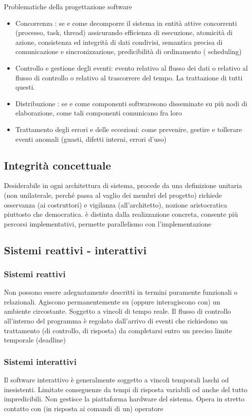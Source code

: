 Problematiche della progettazione software
\begin{itemize}
\item Concorrenza : se e come decomporre il sistema in entità attive concorrenti (processo, task, thread) assicurando efficienza di esecuzione, atomicità di azione, consistenza ed integrità di dati condivisi, semantica precisa di comunicazione e sincronizzazione, predicibilità di ordinamento ( scheduling)
\item Controllo e gestione degli eventi: evento relativo al flusso dei dati o relativo al flusso di controllo o relativo al trascorrere del tempo. La trattazione di tutti questi.
\item Distribuzione : se e come componenti softwaresono disseminate su più nodi di elaborazione, come tali componenti comunicano fra loro
\item Trattamento degli errori e delle eccezioni: come prevenire, gestire e tollerare eventi anomali (guasti, difetti interni, errori d'uso)
\end{itemize}

\subsection{Integrità concettuale}
Desiderabile in ogni architettura di sistema, procede da una definizione unitaria (non unilaterale, perché passa al vaglio dei membri del progetto) richiede osservanza (ai costruttori) e vigilanza (all'architetto), nozione aristocratica piuttosto che democratica. è distinta dalla realizzazione concreta, consente più percorsi implementativi, permette parallelismo con l'implementazione

\subsection{Sistemi reattivi - interattivi}
\subsubsection{Sistemi reattivi} 
Non possono essere adeguatamente descritti in termini puramente funzionali o relazionali. Agiscono permanentemente su (oppure interagiscono con) un ambiente circostante. Soggetto a vincoli di tempo reale. Il flusso di controllo all'interno del programma è regolato dall'arrivo di eventi che richiedono un trattamento (di controllo, di risposta) da completarsi entro un preciso limite temporale (deadline)
\subsubsection{Sistemi interattivi}
Il software interattivo è generalmente soggetto a vincoli temporali laschi od inesistenti. Limitate conseguenze da tempi di risposta variabili od anche del tutto impredicibili. Non gestisce la piattaforma hardware del sistema. Opera in stretto contatto con (in risposta ai comandi di un) operatore
